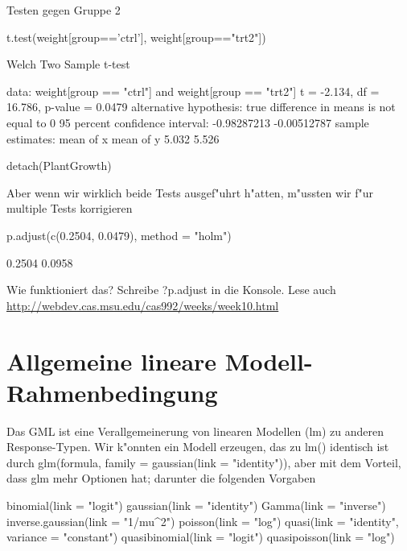 \documentclass[a4paper,twoside]{tufte-book}\usepackage[]{graphicx}\usepackage[]{color}
\begin{document}
\begin{appendices}
Testen gegen Gruppe 2

\begin{Schunk}
\begin{Sinput}
t.test(weight[group=='ctrl'], weight[group=="trt2"])
\end{Sinput}
\begin{Soutput}

	Welch Two Sample t-test

data:  weight[group == "ctrl"] and weight[group == "trt2"]
t = -2.134, df = 16.786, p-value = 0.0479
alternative hypothesis: true difference in means is not equal to 0
95 percent confidence interval:
 -0.98287213 -0.00512787
sample estimates:
mean of x mean of y 
    5.032     5.526 
\end{Soutput}
\begin{Sinput}
detach(PlantGrowth)
\end{Sinput}
\end{Schunk}

Aber wenn wir wirklich beide Tests ausgef"uhrt h"atten, m"ussten wir f"ur multiple Tests korrigieren

\begin{Schunk}
\begin{Sinput}
p.adjust(c(0.2504, 0.0479), method = "holm")
\end{Sinput}
\begin{Soutput}
[1] 0.2504 0.0958
\end{Soutput}
\end{Schunk}

Wie funktioniert das? Schreibe ?p.adjust in die Konsole. Lese auch \href{das hier}{http://webdev.cas.msu.edu/cas992/weeks/week10.html}

\section{Allgemeine lineare Modell-Rahmenbedingung}

Das GML ist eine Verallgemeinerung von linearen Modellen (lm) zu anderen Response-Typen. Wir k"onnten ein Modell erzeugen, das zu lm() identisch ist durch glm(formula, family = gaussian(link = "identity")), aber mit dem Vorteil, dass glm mehr Optionen hat; darunter die folgenden Vorgaben

\begin{Schunk}
\begin{Sinput}
binomial(link = "logit")
gaussian(link = "identity")
Gamma(link = "inverse")
inverse.gaussian(link = "1/mu^2")
poisson(link = "log")
quasi(link = "identity", variance = "constant")
quasibinomial(link = "logit")
quasipoisson(link = "log")
\end{Sinput}
\end{Schunk}


\end{appendices}
\end{document}
